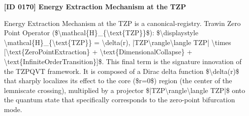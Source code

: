 \clearpage
\noindent\textbf{[ID 0170] Energy Extraction Mechanism at the TZP}\par
\vspace{0.35em}
\begingroup\small
{}
Energy Extraction Mechanism at the TZP is a canonical-registry. Trawin Zero Point Operator (\$\textbackslash{}mathcal\{H\}\_\{\textbackslash{}text\{TZP\}\}\$): \$\textbackslash{}displaystyle \textbackslash{}mathcal\{H\}\_\{\textbackslash{}text\{TZP\}\} = \textbackslash{}delta(r), |TZP\textbackslash{}rangle\textbackslash{}langle TZP| \textbackslash{}times [\textbackslash{}text\{ZeroPointExtraction\} + \textbackslash{}text\{DimensionalCollapse\} + \textbackslash{}text\{InfiniteOrderTransition\}]\$. This final term is the signature innovation of the TZPQVT framework. It is composed of a Dirac delta function \$\textbackslash{}delta(r)\$ that sharply localizes its effect to the core (\$r=0\$) region (the center of the lemniscate crossing), multiplied by a projector \$|TZP\textbackslash{}rangle\textbackslash{}langle TZP|\$ onto the quantum state that specifically corresponds to the zero-point bifurcation mode.

